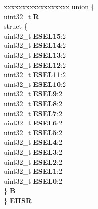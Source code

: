 \begin{DoxyCompactItemize}
\begin{tabbing}
\end{tabbing}\item 
\mbox{\label{structSIU__tag_a369c013e86f6add1564cd57849dbd3d1}} 
\begin{tabbing}
xx\=xx\=xx\=xx\=xx\=xx\=xx\=xx\=xx\=\kill
union \{\\
\>uint32\_t {\bfseries R}\\
\>struct \{\\
\>\>uint32\_t {\bfseries ESEL15}:2\\
\>\>uint32\_t {\bfseries ESEL14}:2\\
\>\>uint32\_t {\bfseries ESEL13}:2\\
\>\>uint32\_t {\bfseries ESEL12}:2\\
\>\>uint32\_t {\bfseries ESEL11}:2\\
\>\>uint32\_t {\bfseries ESEL10}:2\\
\>\>uint32\_t {\bfseries ESEL9}:2\\
\>\>uint32\_t {\bfseries ESEL8}:2\\
\>\>uint32\_t {\bfseries ESEL7}:2\\
\>\>uint32\_t {\bfseries ESEL6}:2\\
\>\>uint32\_t {\bfseries ESEL5}:2\\
\>\>uint32\_t {\bfseries ESEL4}:2\\
\>\>uint32\_t {\bfseries ESEL3}:2\\
\>\>uint32\_t {\bfseries ESEL2}:2\\
\>\>uint32\_t {\bfseries ESEL1}:2\\
\>\>uint32\_t {\bfseries ESEL0}:2\\
\>\} {\bfseries B}\\
\} {\bfseries EIISR}\\


\end{tabbing}
\end{DoxyCompactItemize}
